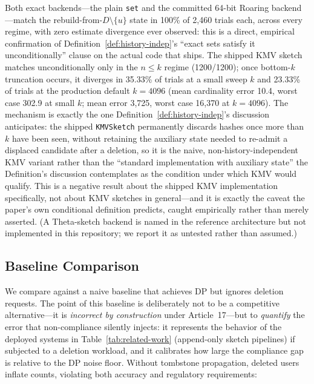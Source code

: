 \documentclass[sigconf,anonymous,review]{acmart}
\begin{document}
Both exact backends---the plain \texttt{set} and the committed 64-bit Roaring backend---match the rebuild-from-$D\setminus\{u\}$ state in 100\% of 2{,}460 trials each, across every regime, with zero estimate divergence ever observed: this is a direct, empirical confirmation of Definition~\ref{def:history-indep}'s ``exact sets satisfy it unconditionally'' clause on the actual code that ships. The shipped KMV sketch matches unconditionally only in the $n \le k$ regime (1200/1200); once bottom-$k$ truncation occurs, it diverges in 35.33\% of trials at a small sweep $k$ and 23.33\% of trials at the production default $k=4096$ (mean cardinality error 10.4, worst case 302.9 at small $k$; mean error 3{,}725, worst case 16{,}370 at $k=4096$). The mechanism is exactly the one Definition~\ref{def:history-indep}'s discussion anticipates: the shipped \texttt{KMVSketch} permanently discards hashes once more than $k$ have been seen, without retaining the auxiliary state needed to re-admit a displaced candidate after a deletion, so it is the naive, non-history-independent KMV variant rather than the ``standard implementation with auxiliary state'' the Definition's discussion contemplates as the condition under which KMV would qualify. This is a negative result about the shipped KMV implementation specifically, not about KMV sketches in general---and it is exactly the caveat the paper's own conditional definition predicts, caught empirically rather than merely asserted. (A Theta-sketch backend is named in the reference architecture but not implemented in this repository; we report it as untested rather than assumed.)

\subsection{Baseline Comparison}
\label{sec:baseline-comparison}

We compare against a naive baseline that achieves DP but ignores deletion requests. The point of this baseline is deliberately not to be a competitive alternative---it is \emph{incorrect by construction} under Article~17---but to \emph{quantify} the error that non-compliance silently injects: it represents the behavior of the deployed systems in Table~\ref{tab:related-work} (append-only sketch pipelines) if subjected to a deletion workload, and it calibrates how large the compliance gap is relative to the DP noise floor. Without tombstone propagation, deleted users inflate counts, violating both accuracy and regulatory requirements:
\end{document}
